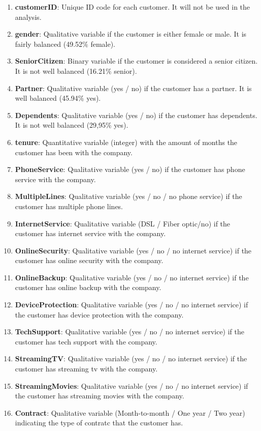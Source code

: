 \documentclass[a4paper,11pt]{article}
\begin{document}
\begin{enumerate}
	\item \textbf{customerID}: Unique ID code for each customer. It will not be used in the analysis.
	\item \textbf{gender}: Qualitative variable if the customer is either female or male. It is fairly balanced (49.52\% female).
	\item \textbf{SeniorCitizen}: Binary variable if the customer is considered a senior citizen. It is not well balanced (16.21\% senior).
	\item \textbf{Partner}: Qualitative variable (yes / no) if the customer has a partner. It is well balanced (45.94\% yes).
	\item \textbf{Dependents}: Qualitative variable (yes / no) if the customer has dependents. It is not well balanced (29,95\% yes).
	\item \textbf{tenure}: Quantitative variable (integer) with the amount of months the customer has been with the company.
	\item \textbf{PhoneService}: Qualitative variable (yes / no) if the customer has phone service with the company.
	\item \textbf{MultipleLines}: Qualitative variable (yes / no / no phone service) if the customer has multiple phone lines.
	\item \textbf{InternetService}: Qualitative variable (DSL / Fiber optic/no) if the customer has internet service with the company.
	\item \textbf{OnlineSecurity}: Qualitative variable (yes / no / no internet service) if the customer has online security with the company.
	\item \textbf{OnlineBackup}: Qualitative variable (yes / no / no internet service) if the customer has online backup with the company.
	\item \textbf{DeviceProtection}: Qualitative variable (yes / no / no internet service) if the customer has device protection with the company.
	\item \textbf{TechSupport}: Qualitative variable (yes / no / no internet service) if the customer has tech support with the company.
	\item \textbf{StreamingTV}: Qualitative variable (yes / no / no internet service) if the customer has streaming tv with the company.
	\item \textbf{StreamingMovies}: Qualitative variable (yes / no / no internet service) if the customer has streaming movies with the company.
	\item \textbf{Contract}: Qualitative variable (Month-to-month / One year / Two year) indicating the type of contratc that the customer has.

\end{enumerate}
\end{document}
